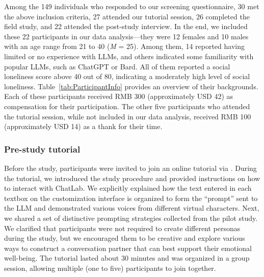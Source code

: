 Among the 149 individuals who responded to our screening questionnaire, 30 met the above inclusion criteria, 27 attended our tutorial session, 26 completed the field study, and 22 attended the post-study interview. In the end, we included these 22 participants in our data analysis---they were 12 females and 10 males with an age range from 21 to 40 (\textit{M} = 25). Among them, 14 reported having limited or no experience with LLMs, and others indicated some familiarity with popular LLMs, such as ChatGPT or Bard. 
All of them reported a social loneliness score above 40 out of 80, indicating a moderately high level of social loneliness. Table~\ref{tab:ParticipantInfo} provides an overview of their backgrounds.
Each of these participants received RMB 300 (approximately USD 42) as compensation for their participation. 
The other five participants who attended the tutorial session, while not included in our data analysis, received RMB 100 (approximately USD 14) as a thank for their time.

\subsubsection{Pre-study tutorial}
Before the study, participants were invited to join an online tutorial via . During the tutorial, we introduced the study procedure and provided instructions on how to interact with ChatLab. We explicitly explained how the text entered in each textbox on the customization interface is organized to form the ``prompt'' sent to the LLM and demonstrated various voices from different virtual characters. Next, we shared a set of distinctive prompting strategies collected from the pilot study. We clarified that participants were not required to create different personas during the study, but we encouraged them to be creative and explore various ways to construct a conversation partner that can best support their emotional well-being. 
The tutorial lasted about 30 minutes and was organized in a group session, allowing multiple (one to five) participants to join together. 

